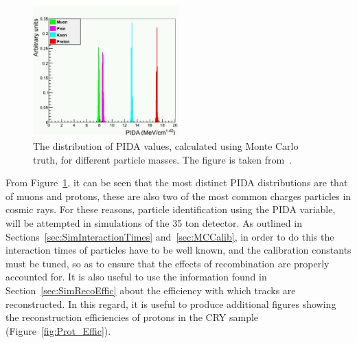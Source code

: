 \begin{figure}
  \centering
  \includegraphics[width=0.5\textwidth]{TruthPIDA}
  \caption[The distribution of PIDA values, calculated using Monte Carlo truth, for different particle masses]
          {The distribution of PIDA values, calculated using Monte Carlo truth, for different particle masses. The figure is taken from~\citep{PIDA_Paper}.}
  \label{fig:PIDA_MC}
\end{figure}

From Figure~\ref{fig:PIDA_MC}, it can be seen that the most distinct PIDA distributions are that of muons and protons, these are also two of the most common charges particles in cosmic rays. For these reasons, particle identification using the PIDA variable, will be attempted in simulations of the 35 ton detector. As outlined in Sections~\ref{sec:SimInteractionTimes} and~\ref{sec:MCCalib}, in order to do this the interaction times of particles have to be well known, and the calibration constants must be tuned, so as to ensure that the effects of recombination are properly accounted for. It is also useful to use the information found in Section~\ref{sec:SimRecoEffic} about the efficiency with which tracks are reconstructed. In this regard, it is useful to produce additional figures showing the reconstruction efficiencies of protons in the CRY sample (Figure~\ref{fig:Prot_Effic}).\\

